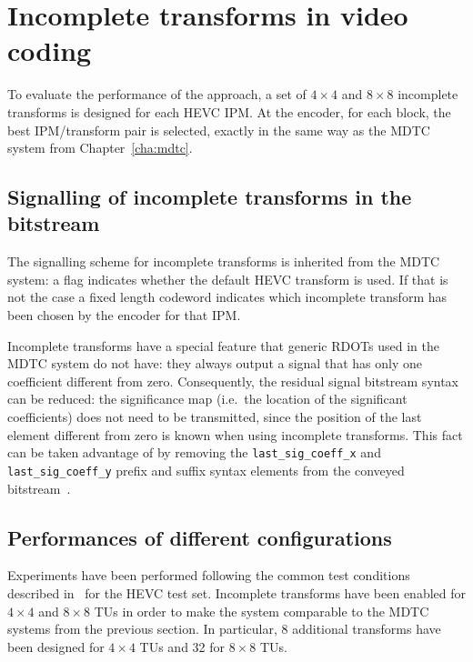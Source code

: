 \documentclass[11pt,a4paper,openright,twoside]{book}
\numberwithin{equation}{section} %
\numberwithin{figure}{section} %
\numberwithin{table}{section} %
\begin{document}
\section{Incomplete transforms in video coding}
\label{sec:it_video_coding}

To evaluate the performance of the approach, a set of $4\times4$ and
$8\times8$ incomplete transforms is designed for each \ac{HEVC} \ac{IPM}.
At the encoder, for each block, the best \ac{IPM}/transform pair is selected,
exactly in the same way as the \ac{MDTC} system from Chapter~\ref{cha:mdtc}.

\subsection{Signalling of incomplete transforms in the bitstream}
\label{sub:it_signalling}

The signalling scheme for incomplete transforms is inherited from the
\ac{MDTC} system:
a flag indicates whether the default \ac{HEVC} transform is used.
If that is not the case a fixed length codeword indicates which incomplete
transform has been chosen by the encoder for that \ac{IPM}.

Incomplete transforms have a special feature that generic \acp{RDOT} used in
the \ac{MDTC} system do not have:
they always output a signal that has only one coefficient different from zero.
Consequently, the residual signal bitstream syntax can be reduced:
the significance map (i.e.\ the location of the significant coefficients) does
not need to be transmitted, since the position of the last element different
from zero is known when using incomplete transforms.
This fact can be taken advantage of by removing the
\texttt{last\_sig\_coeff\_x} and \texttt{last\_sig\_coeff\_y} prefix and
suffix syntax elements from the conveyed bitstream~\cite{JCTVC-G704}.

\subsection{Performances of different configurations}
\label{sub:it_performances}

Experiments have been performed following the common test conditions described
in~\cite{bossen-12-common-test-conditions} for the \ac{HEVC} test set.
Incomplete transforms have been enabled for $4\times4$ and $8\times8$
\acp{TU} in order to make the system comparable to the \ac{MDTC} systems from
the previous section.
In particular, 8 additional transforms have been designed for $4\times4$
\acp{TU} and 32 for $8\times8$ \acp{TU}.
\end{document}
